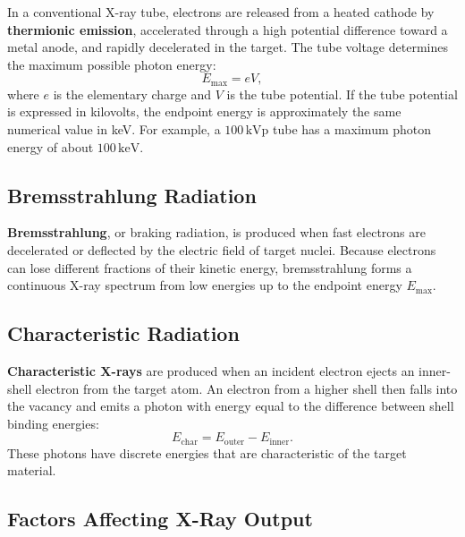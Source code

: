 \documentclass[12pt]{article}
\begin{document}
In a conventional X-ray tube, electrons are released from a heated cathode by \textbf{thermionic emission}, accelerated through a high potential difference toward a metal anode, and rapidly decelerated in the target. The tube voltage determines the maximum possible photon energy:
\begin{equation}
    E_{\max} = eV,
\end{equation}
where $e$ is the elementary charge and $V$ is the tube potential. If the tube potential is expressed in kilovolts, the endpoint energy is approximately the same numerical value in keV. For example, a $100\,\mathrm{kVp}$ tube has a maximum photon energy of about $100\,\mathrm{keV}$.

\subsection{Bremsstrahlung Radiation}

\textbf{Bremsstrahlung}, or braking radiation, is produced when fast electrons are decelerated or deflected by the electric field of target nuclei. Because electrons can lose different fractions of their kinetic energy, bremsstrahlung forms a continuous X-ray spectrum from low energies up to the endpoint energy $E_{\max}$.

\subsection{Characteristic Radiation}

\textbf{Characteristic X-rays} are produced when an incident electron ejects an inner-shell electron from the target atom. An electron from a higher shell then falls into the vacancy and emits a photon with energy equal to the difference between shell binding energies:
\begin{equation}
    E_{\mathrm{char}} = E_{\mathrm{outer}} - E_{\mathrm{inner}}.
\end{equation}
These photons have discrete energies that are characteristic of the target material.

\subsection{Factors Affecting X-Ray Output}
\end{document}
